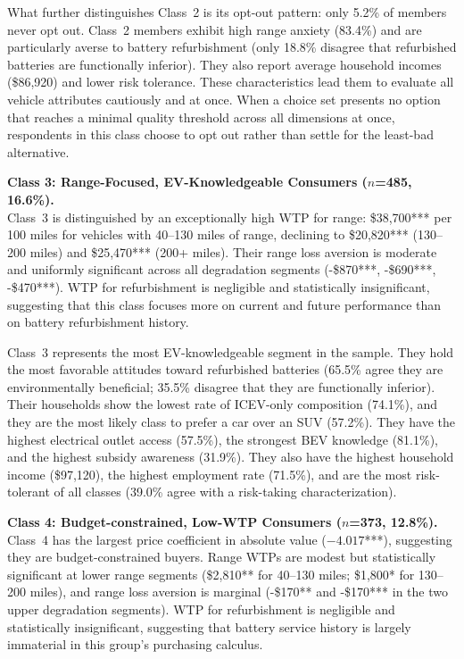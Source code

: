 \documentclass[a4paper,fleqn]{cas-sc}   %
\begin{document}
What further distinguishes Class~2 is its opt-out pattern: only 5.2\% of members never opt out. Class~2 members exhibit high range anxiety (83.4\%) and are particularly averse to battery refurbishment (only 18.8\% disagree that refurbished batteries are functionally inferior). They also report average household incomes (\$86,920) and lower risk tolerance. These characteristics lead them to evaluate all vehicle attributes cautiously and at once. When a choice set presents no option that reaches a minimal quality threshold across all dimensions at once, respondents in this class choose to opt out rather than settle for the least-bad alternative.

\medskip

\noindent\textbf{Class 3: Range-Focused, EV-Knowledgeable Consumers ($n$=485, 16.6\%).}\\
Class~3 is distinguished by an exceptionally high WTP for range: \$38,700*** per 100 miles for vehicles with 40--130 miles of range, declining to \$20,820*** (130--200 miles) and \$25,470*** (200+ miles). Their range loss aversion is moderate and uniformly significant across all degradation segments (-\$870***, -\$690***, -\$470***). WTP for refurbishment is negligible and statistically insignificant, suggesting that this class focuses more on current and future performance than on battery refurbishment history.

Class~3 represents the most EV-knowledgeable segment in the sample. They hold the most favorable attitudes toward refurbished batteries (65.5\% agree they are environmentally beneficial; 35.5\% disagree that they are functionally inferior). Their households show the lowest rate of ICEV-only composition (74.1\%), and they are the most likely class to prefer a car over an SUV (57.2\%). They have the highest electrical outlet access (57.5\%), the strongest BEV knowledge (81.1\%), and the highest subsidy awareness (31.9\%). They also have the highest household income (\$97,120), the highest employment rate (71.5\%), and are the most risk-tolerant of all classes (39.0\% agree with a risk-taking characterization).

\medskip

\noindent\textbf{Class 4: Budget-constrained, Low-WTP Consumers ($n$=373, 12.8\%).}\\
Class~4 has the largest price coefficient in absolute value ($-4.017$***), suggesting they are budget-constrained buyers. Range WTPs are modest but statistically significant at lower range segments (\$2,810** for 40--130 miles; \$1,800* for 130--200 miles), and range loss aversion is marginal (-\$170** and -\$170*** in the two upper degradation segments). WTP for refurbishment is negligible and statistically insignificant, suggesting that battery service history is largely immaterial in this group's purchasing calculus.
\end{document}
